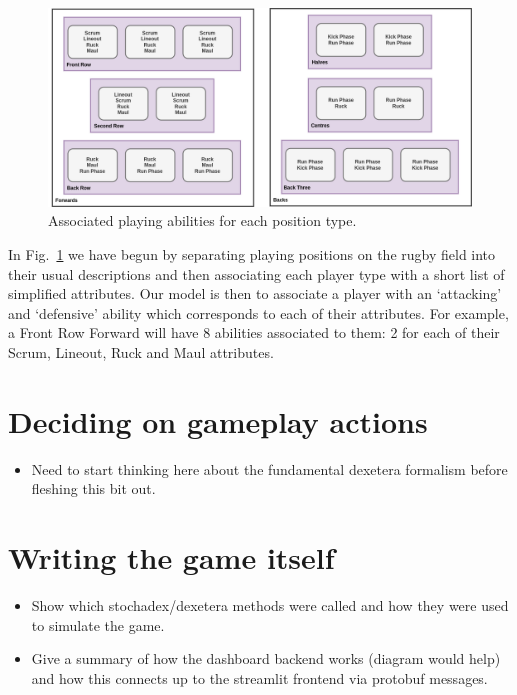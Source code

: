 \begin{figure}[h]
\includegraphics[width=15cm]{images/rugby-player-abilities.drawio.png}
\caption{Associated playing abilities for each position type.}
\label{fig:player-abilities}
\end{figure}

In Fig.~\ref{fig:player-abilities} we have begun by separating playing positions on the rugby field into their usual descriptions and then associating each player type with a short list of simplified attributes. Our model is then to associate a player with an `attacking' and `defensive' ability which corresponds to each of their attributes. For example, a Front Row Forward will have 8 abilities associated to them: 2 for each of their {\sf Scrum}, {\sf Lineout}, {\sf Ruck} and {\sf Maul} attributes.

 


\section{\sffamily Deciding on gameplay actions}


\begin{itemize}
\item{Need to start thinking here about the fundamental dexetera formalism before fleshing this bit out.}
\end{itemize}

\section{\sffamily Writing the game itself}

\begin{itemize}
\item{Show which stochadex/dexetera methods were called and how they were used to simulate the game.}
\item{Give a summary of how the dashboard backend works (diagram would help) and how this connects up to the streamlit frontend via protobuf messages.}
\end{itemize}